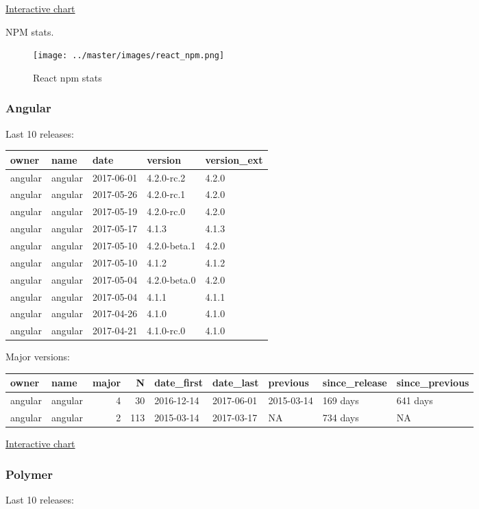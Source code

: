 \href{https://plot.ly/~m.ziembinski/7/}{Interactive chart}

NPM stats.

\begin{figure}
\centering
\texttt{[image: ../master/images/react\_npm.png]}
\caption{React npm stats}
\end{figure}

\subsubsection{Angular}\label{angular}

Last 10 releases:

\begin{longtable}[]{@{}lllll@{}}
\toprule
owner & name & date & version & version\_ext\tabularnewline
\midrule
\endhead
angular & angular & 2017-06-01 & 4.2.0-rc.2 & 4.2.0\tabularnewline
angular & angular & 2017-05-26 & 4.2.0-rc.1 & 4.2.0\tabularnewline
angular & angular & 2017-05-19 & 4.2.0-rc.0 & 4.2.0\tabularnewline
angular & angular & 2017-05-17 & 4.1.3 & 4.1.3\tabularnewline
angular & angular & 2017-05-10 & 4.2.0-beta.1 & 4.2.0\tabularnewline
angular & angular & 2017-05-10 & 4.1.2 & 4.1.2\tabularnewline
angular & angular & 2017-05-04 & 4.2.0-beta.0 & 4.2.0\tabularnewline
angular & angular & 2017-05-04 & 4.1.1 & 4.1.1\tabularnewline
angular & angular & 2017-04-26 & 4.1.0 & 4.1.0\tabularnewline
angular & angular & 2017-04-21 & 4.1.0-rc.0 & 4.1.0\tabularnewline
\bottomrule
\end{longtable}

Major versions:

\begin{longtable}[]{@{}llrrlllll@{}}
\toprule
owner & name & major & N & date\_first & date\_last & previous &
since\_release & since\_previous\tabularnewline
\midrule
\endhead
angular & angular & 4 & 30 & 2016-12-14 & 2017-06-01 & 2015-03-14 & 169
days & 641 days\tabularnewline
angular & angular & 2 & 113 & 2015-03-14 & 2017-03-17 & NA & 734 days &
NA\tabularnewline
\bottomrule
\end{longtable}

\href{https://plot.ly/~m.ziembinski/9/}{Interactive chart}

\subsubsection{Polymer}\label{polymer}

Last 10 releases:

